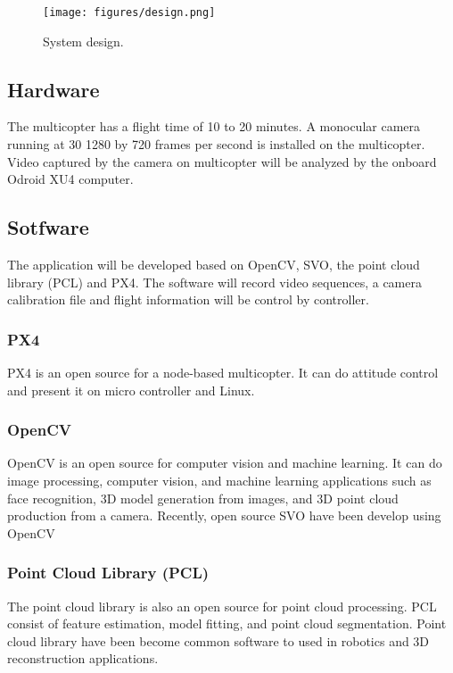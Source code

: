 \documentclass[12pt, a4paper]{aitthesis}
\begin{document}
\begin{figure}[t]
\begin{center}
	\texttt{[image: figures/design.png]}
	\caption[System design]{System design.} \label{fig:ardrone2}
\end{center}
\end{figure}

\FloatBarrier

\subsection{Hardware}
The multicopter has a flight time of 10 to 20 minutes. A monocular camera running at 30 1280 by 720 frames per second is installed on the multicopter. Video captured by the camera on multicopter will be analyzed by the onboard Odroid XU4 computer.  

\subsection{Sotfware}

The application will be developed based on OpenCV, SVO, the point cloud library (PCL) and PX4. The software will record video sequences, a camera calibration file and flight information will be control by controller. 
\subsubsection{PX4}

PX4 is an open source for a node-based multicopter. It can do attitude control and present it on micro controller and Linux.  


\subsubsection{OpenCV}

OpenCV is an open source for computer vision and machine learning. It can do image processing, computer vision, and machine learning applications such as face recognition, 3D model generation from images, and 3D point cloud production from a camera. Recently, open source SVO have been develop using OpenCV


\subsubsection{Point Cloud Library (PCL)}

The point cloud library is also an open source for point cloud processing. PCL consist of feature estimation, model fitting, and point cloud segmentation. Point cloud library have been become common software to used in robotics and 3D reconstruction applications.
\end{document}
